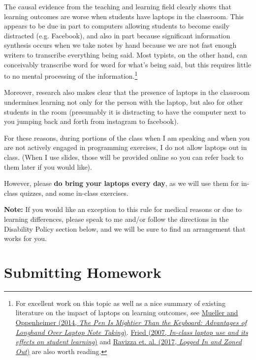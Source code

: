 \documentclass[12pt]{article}
\begin{document}
The causal evidence from the teaching and learning field clearly shows that learning outcomes are worse when students have laptops in the classroom. This appears to be due in part to computers allowing students to become easily distracted (e.g. Facebook), and also in part because significant information synthesis occurs when we take notes by hand because we are not fast enough writers to transcribe everything being said.  Most typists, on the other hand, can conceivably transcribe word for word for what's being said, but this requires little to no mental processing of the information.\footnote{For excellent work on this topic as well as a nice summary of existing literature on the impact of laptops on learning outcomes, see \href{https://cpb-us-w2.wpmucdn.com/sites.udel.edu/dist/6/132/files/2010/11/Psychological-Science-2014-Mueller-0956797614524581-1u0h0yu.pdf}{Mueller and Oppenheimer (2014, \emph{The Pen Is Mightier Than the Keyboard: Advantages of Longhand Over Laptop  Note Taking})}. \href{https://www.winona.edu/psychology/media/friedlaptopfinal.pdf}{Fried (2007, \emph{In-class laptop use and its effects on student learning})} and  \href{https://www.ncbi.nlm.nih.gov/pubmed/28182528}{Ravizza et. al. (2017, \emph{Logged In and Zoned Out})} are also worth reading.}

Moreover, research also makes clear that the presence of laptops in the classroom undermines learning not only for the person with the laptop, but also for other students in the room (presumably it is distracting to have the computer next to you jumping back and forth from instagram to facebook).

For these reasons, during portions of the class when I am speaking and when you are not actively engaged in programming exercises, I do not allow laptops out in class. (When I use slides, those will be provided online so you can refer back to them later if you would like).

However, please \textbf{do bring your laptops every day}, as we will use them for in-class quizzes, and some in-class exercises.

\textbf{Note:} If you would like an exception to this rule for medical reasons or due to learning differences, please speak to me and/or follow the directions in the Disability Policy section below, and we will be sure to find an arrangement that works for you.

\section{Submitting Homework}
\end{document}

